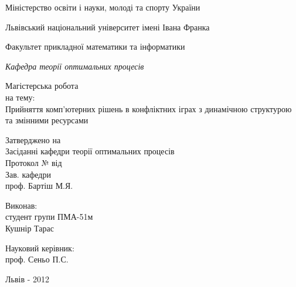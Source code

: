 \documentclass[12pt,a4paper]{article}
\begin{document}
\setlength{\topmargin}{-1cm}
\thispagestyle{empty}
\setlength{\parindent}{1.5cm}
\fontsize{14pt}{6mm}\selectfont

\begin{center}  
  {\Large
    Міністерство освіти і науки, молоді та спорту України
  
    Львівський національний університет імені Івана Франка

    Факультет прикладної математики та інформатики\\[1cm]
  }
  \begin{flushright}
    \textit{Кафедра теорії оптимальних процесів}\\[3cm]
  \end{flushright}  

  {\Large Магістерська робота}\\[0.5cm]
  {\Large на тему:}\\[0.5cm]
  {\LARGE Прийняття комп'ютерних рішень в конфліктних іграх з
    динамічною структурою та змінними ресурсами}\\[2cm]

  \begin{flushleft}
    Затверджено на\\
    Засіданні кафедри теорії оптимальних процесів\\
    Протокол № \underline{\hspace*{1.5cm}} від \underline{\hspace*{3cm}}\\[0.2cm]
    Зав. кафедри\\
    \underline{\hspace*{5cm}} проф. Бартіш М.Я.\\[2cm]
  \end{flushleft}
  
  \begin{flushleft}
    Виконав:\\
    студент групи ПМА-51м\\
    Кушнір Тарас\linebreak

    Науковий керівник:\\
    проф. Сеньо П.С.
  \end{flushleft}
  \vspace{1.5cm}
  Львів - 2012 
\end{center}

\clearpage
\setlength{\footskip}{30pt}
\fontsize{14pt}{6mm}\selectfont
\end{document}
